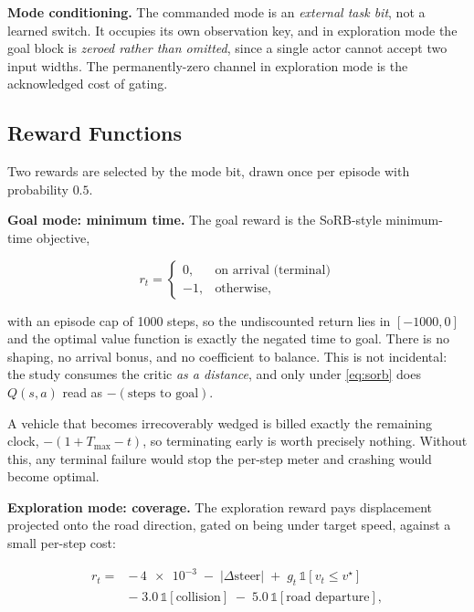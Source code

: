 \textbf{Mode conditioning.} The commanded mode is an \emph{external task bit},
not a learned switch. It occupies its own observation key, and in exploration
mode the goal block is \emph{zeroed rather than omitted}, since a single actor
cannot accept two input widths. The permanently-zero channel in exploration mode
is the acknowledged cost of gating.

\subsection{Reward Functions}
\label{sec:setup:reward}

Two rewards are selected by the mode bit, drawn once per episode with
probability $0.5$.

\textbf{Goal mode: minimum time.} The goal reward is the SoRB-style
minimum-time objective,

\begin{equation}
\label{eq:sorb}
  r_t =
  \begin{cases}
    0,  & \text{on arrival (terminal)}\\
    -1, & \text{otherwise,}
  \end{cases}
\end{equation}

with an episode cap of \num{1000} steps, so the undiscounted return lies in
$[-1000, 0]$ and the optimal value function is exactly the negated time to goal.
There is no shaping, no arrival bonus, and no coefficient to balance. This is
not incidental: the study consumes the critic \emph{as a distance}, and only
under \eqref{eq:sorb} does $Q(s,a)$ read as $-(\text{steps to goal})$.

A vehicle that becomes irrecoverably wedged is billed exactly the remaining
clock, $-(1 + T_{\max} - t)$, so terminating early is worth precisely nothing.
Without this, any terminal failure would stop the per-step meter and crashing
would become optimal.

\textbf{Exploration mode: coverage.} The exploration reward pays displacement
projected onto the road direction, gated on being under target speed, against a
small per-step cost:

\begin{align}
\label{eq:explore}
  r_t = &-\,\num{4e-3} \;-\; |\Delta \mathrm{steer}| \;+\;
          g_t\,\mathbb{1}[v_t \le v^{\star}] \nonumber\\
        &-\; 3.0\,\mathbb{1}[\text{collision}]
         \;-\; 5.0\,\mathbb{1}[\text{road departure}],
\end{align}

